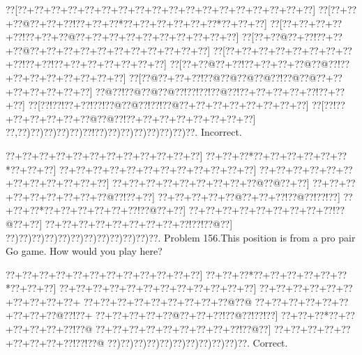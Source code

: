 \documentclass[a5paper]{article}
\begin{document}
\begin{center}
{\goo
\0??[\0??+\0??+\0??+\0??+\0??+\0??+\0??+\0??+\0??+\0??+\0??+\0??+\0??+\0??+\0??+\0??+\0??+\0??]
\0??[\0??+\0??+\0??@\0??+\0??+\0??!\0??+\0??+\0??*\0??+\0??+\0??+\0??+\0??+\0??*\0??+\0??+\0??]
\0??[\0??+\0??+\0??+\0??+\0??!\0??+\0??+\0??@\0??+\0??+\0??+\0??+\0??+\0??+\0??+\0??+\0??+\0??]
\0??[\0??+\0??@\0??+\0??!\0??+\0??+\0??@\0??+\0??+\0??+\0??+\0??+\0??+\0??+\0??+\0??+\0??+\0??]
\0??[\0??+\0??+\0??+\0??+\0??+\0??+\0??+\0??+\0??!\0??+\0??!\0??+\0??+\0??+\0??+\0??+\0??+\0??]
\0??[\0??+\0??@\0??+\0??!\0??+\0??+\0??+\0??@\0??@\0??!\0??+\0??+\0??+\0??+\0??+\0??+\0??+\0??]
\0??[\0??@\0??+\0??+\0??!\0??@\0??@\0??@\0??@\0??!\0??@\0??@\0??+\0??+\0??+\0??+\0??+\0??+\0??]
\0??@\0??!\0??@\0??@\0??@\0??!\0??!\0??!\0??@\0??!\0??+\0??+\0??+\0??+\0??!\0??+\0??+\0??]
\0??[\0??!\0??!\0??+\0??!\0??!\0??@\0??@\0??!\0??!\0??@\0??+\0??+\0??+\0??+\0??+\0??+\0??+\0??]
\0??[\0??!\0??+\0??+\0??+\0??+\0??+\0??@\0??@\0??!\0??+\0??+\0??+\0??+\0??+\0??+\0??+\0??]
\0??,\0??)\0??)\0??)\0??)\0??)\0??!\0??)\0??)\0??)\0??)\0??)\0??)\0??)\0??.
}
Incorrect. 

\end{center}
\newpage
\begin{center}
{\goo
\0??+\0??+\0??+\0??+\0??+\0??+\0??+\0??+\0??+\0??+\0??+\0??]
\0??+\0??+\0??*\0??+\0??+\0??+\0??+\0??+\0??*\0??+\0??+\0??]
\0??+\0??+\0??+\0??+\0??+\0??+\0??+\0??+\0??+\0??+\0??+\0??]
\0??+\0??+\0??+\0??+\0??+\0??+\0??+\0??+\0??+\0??+\0??+\0??]
\0??+\0??+\0??+\0??+\0??+\0??+\0??+\0??+\0??@\0??@\0??+\0??]
\0??+\0??+\0??+\0??+\0??+\0??+\0??+\0??+\0??@\0??!\0??+\0??]
\0??+\0??+\0??+\0??+\0??@\0??+\0??+\0??!\0??@\0??!\0??!\0??]
\0??+\0??+\0??*\0??+\0??+\0??+\0??+\0??+\0??!\0??@\0??+\0??]
\0??+\0??+\0??+\0??+\0??+\0??+\0??+\0??+\0??!\0??@\0??+\0??]
\0??+\0??+\0??+\0??+\0??+\0??+\0??+\0??+\0??!\0??!\0??@\0??]
\0??)\0??)\0??)\0??)\0??)\0??)\0??)\0??)\0??)\0??)\0??)\0??.
}
Problem 156.This position is from a pro pair Go game. How would you play here?

\end{center}
\begin{center}
{\goo
\0??+\0??+\0??+\0??+\0??+\0??+\0??+\0??+\0??+\0??+\0??+\0??]
\0??+\0??+\0??*\0??+\0??+\0??+\0??+\0??+\0??*\0??+\0??+\0??]
\0??+\0??+\0??+\0??+\0??+\0??+\0??+\0??+\0??+\0??+\0??+\0??]
\0??+\0??+\0??+\0??+\0??+\0??+\0??+\0??+\0??+\0??+
\0??+\0??+\0??+\0??+\0??+\0??+\0??+\0??+\0??@\0??@
\0??+\0??+\0??+\0??+\0??+\0??+\0??+\0??+\0??@\0??!\0??+
\0??+\0??+\0??+\0??+\0??@\0??+\0??+\0??!\0??@\0??!\0??!\0??]
\0??+\0??+\0??*\0??+\0??+\0??+\0??+\0??+\0??!\0??@
\0??+\0??+\0??+\0??+\0??+\0??+\0??+\0??+\0??!\0??@\0??]
\0??+\0??+\0??+\0??+\0??+\0??+\0??+\0??+\0??!\0??!\0??@
\0??)\0??)\0??)\0??)\0??)\0??)\0??)\0??)\0??)\0??)\0??.
}
Correct. 

\end{center}
\end{document}
